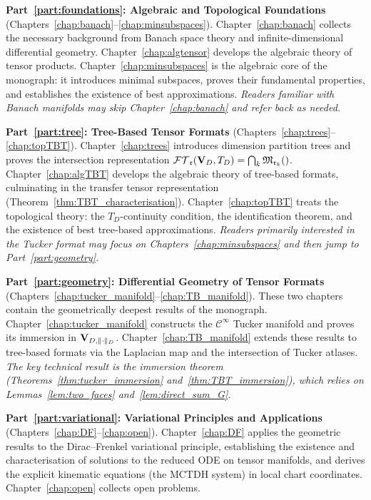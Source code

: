 \textbf{Part~\ref{part:foundations}: Algebraic and Topological Foundations}
(Chapters~\ref{chap:banach}--\ref{chap:minsubspaces}).
Chapter~\ref{chap:banach} collects the necessary background from Banach
space theory and infinite-dimensional differential geometry.
Chapter~\ref{chap:algtensor} develops the algebraic theory of tensor
products. Chapter~\ref{chap:minsubspaces} is the algebraic core of the
monograph: it introduces minimal subspaces, proves their fundamental
properties, and establishes the existence of best approximations.
\emph{Readers familiar with Banach manifolds may skip
Chapter~\ref{chap:banach} and refer back as needed.}

\textbf{Part~\ref{part:tree}: Tree-Based Tensor Formats}
(Chapters~\ref{chap:trees}--\ref{chap:topTBT}).
Chapter~\ref{chap:trees} introduces dimension partition trees and
proves the intersection representation $\mathcal{FT}_{\mathfrak{r}}(\mathbf{V}_D,T_D) = \bigcap_k \mathfrak{M}_{\mathfrak{r}_k}()$.
Chapter~\ref{chap:algTBT} develops the algebraic theory of tree-based
formats, culminating in the transfer tensor representation
(Theorem~\ref{thm:TBT_characterisation}).
Chapter~\ref{chap:topTBT} treats the topological theory: the
$T_D$-continuity condition, the identification theorem, and the
existence of best tree-based approximations.
\emph{Readers primarily interested in the Tucker format may focus on
Chapters~\ref{chap:minsubspaces} and then jump to
Part~\ref{part:geometry}.}

\textbf{Part~\ref{part:geometry}: Differential Geometry of Tensor Formats}
(Chapters~\ref{chap:tucker_manifold}--\ref{chap:TB_manifold}).
These two chapters contain the geometrically deepest results of the
monograph. Chapter~\ref{chap:tucker_manifold} constructs the
$\mathcal{C}^\infty$ Tucker manifold and proves its immersion in
$\mathbf{V}_{D,\|\cdot\|_D}$. Chapter~\ref{chap:TB_manifold} extends these results to
tree-based formats via the Laplacian map and the intersection of Tucker
atlases. \emph{The key technical result is the immersion theorem
(Theorems~\ref{thm:tucker_immersion} and~\ref{thm:TBT_immersion}),
which relies on Lemmas~\ref{lem:two_faces} and~\ref{lem:direct_sum_G}.}

\textbf{Part~\ref{part:variational}: Variational Principles and Applications}
(Chapters~\ref{chap:DF}--\ref{chap:open}).
Chapter~\ref{chap:DF} applies the geometric results to the
Dirac--Frenkel variational principle, establishing the existence and
characterisation of solutions to the reduced ODE on tensor manifolds,
and derives the explicit kinematic equations (the MCTDH system) in
local chart coordinates.
Chapter~\ref{chap:open} collects open problems.


